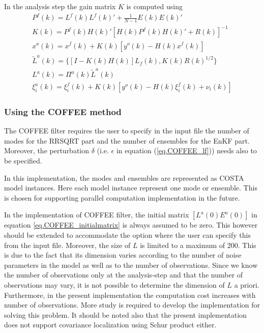 \documentclass[a4paper,12pt]{article}
\begin{document}
\begin{enumerate}
              In the analysis step the gain matrix $K$ is computed using
              \begin{eqnarray}
                P^f(k)=L^f(k)L^f(k)' + \frac{1}{N-1}E(k)E(k)' \\
                K(k) = P^f(k)H(k)'[H(k)P^f(k)H(k)'+R(k)]^{-1} \\
                x^a(k) = x^f(k) + K(k) [y^o(k) - H(k) x^f(k)] \\
                \tilde{L}^a(k)=\{[I - K(k) H(k)] L_f(k), K(k) R(k)^{1/2}\} \label{eq.COFFEE_La} \\
                L^a(k)=\Pi^a(k)\tilde{L}^a(k) \\
                \xi^a_i(k) = \xi^f_i(k) + K(k) [y^o(k) - H(k) \xi^f_i(k) + \nu_i(k)]
              \end{eqnarray}
       \end{enumerate}



\subsubsection{Using the COFFEE method}
         The COFFEE filter requires the user to specify in the input file the
         number of modes for the RRSQRT part and the number of ensembles for
         the EnKF part. Moreover, the perturbation $\delta$ (i.e. $\epsilon$ in
         equation (\ref{eq.COFFEE_lf})) needs also to be specified.

         In this implementation, the modes and ensembles are represented as COSTA model instances. Here each model instance represent one mode or ensemble. This is chosen for supporting parallel computation implementation in the future.

         In the implementation of COFFEE filter, the initial matrix $[L^a(0)
           E^a(0)]$ in equation \ref{eq.COFFEE_initialmatrix} is always assumed
         to be zero. This however should be extended to accommodate the option
         where the user can specify this from the input file. Moreover, the size of
         $L$ is limited to a maximum of 200. This is due to the fact that its
         dimension varies according to the number of noise parameters in the
         model as well as to the number of observations. Since we know the
         number of observations only at the analysis-step and that the number
         of observations may vary, it is not possible to determine the
         dimension of $L$ a priori. Furthermore, in the present implementation
         the computation cost increases with number of observations. More study
         is required to develop the implementation for solving this problem. It
         should be noted also that the present implementation does not support
         covariance localization using Schur product either.
\end{document}
